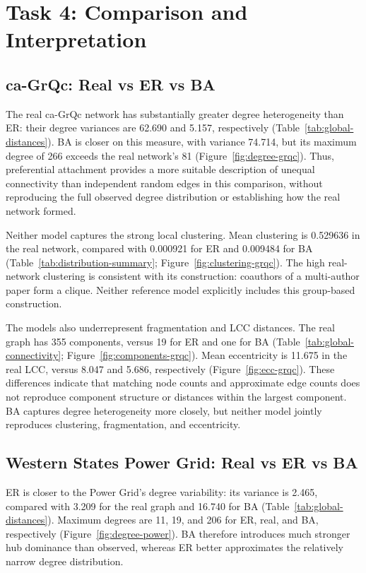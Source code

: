
\section{Task 4: Comparison and Interpretation}

\subsection{ca-GrQc: Real vs ER vs BA}
The real ca-GrQc network has substantially greater degree heterogeneity than ER: their degree variances are 62.690 and 5.157, respectively (Table~\ref{tab:global-distances}). BA is closer on this measure, with variance 74.714, but its maximum degree of 266 exceeds the real network's 81 (Figure~\ref{fig:degree-grqc}). Thus, preferential attachment provides a more suitable description of unequal connectivity than independent random edges in this comparison, without reproducing the full observed degree distribution or establishing how the real network formed.

Neither model captures the strong local clustering. Mean clustering is 0.529636 in the real network, compared with 0.000921 for ER and 0.009484 for BA (Table~\ref{tab:distribution-summary}; Figure~\ref{fig:clustering-grqc}). The high real-network clustering is consistent with its construction: coauthors of a multi-author paper form a clique. Neither reference model explicitly includes this group-based construction.

The models also underrepresent fragmentation and LCC distances. The real graph has 355 components, versus 19 for ER and one for BA (Table~\ref{tab:global-connectivity}; Figure~\ref{fig:components-grqc}). Mean eccentricity is 11.675 in the real LCC, versus 8.047 and 5.686, respectively (Figure~\ref{fig:ecc-grqc}). These differences indicate that matching node counts and approximate edge counts does not reproduce component structure or distances within the largest component. BA captures degree heterogeneity more closely, but neither model jointly reproduces clustering, fragmentation, and eccentricity.

\subsection{Western States Power Grid: Real vs ER vs BA}
ER is closer to the Power Grid's degree variability: its variance is 2.465, compared with 3.209 for the real graph and 16.740 for BA (Table~\ref{tab:global-distances}). Maximum degrees are 11, 19, and 206 for ER, real, and BA, respectively (Figure~\ref{fig:degree-power}). BA therefore introduces much stronger hub dominance than observed, whereas ER better approximates the relatively narrow degree distribution.

